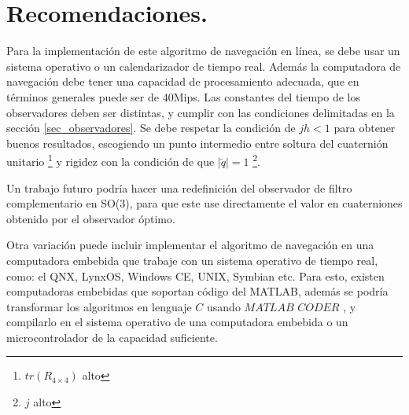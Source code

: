 \documentclass[10pt]{report}
\numberwithin{equation}{chapter}
\numberwithin{algorithm}{chapter}
\begin{document}
\section{Recomendaciones.}
Para la implementación de este algoritmo de navegación en línea, se debe usar un sistema operativo o un calendarizador de tiempo real. Además la computadora de navegación debe tener una capacidad de procesamiento adecuada, que en términos generales puede ser de 40Mips. Las constantes del tiempo de los observadores deben ser distintas, y cumplir con las condiciones delimitadas en la sección \ref{sec_observadores}. Se debe respetar la condición de $jh<1$ para obtener buenos resultados, escogiendo un punto intermedio entre soltura del cuaternión unitario \footnote{$tr(R_{4\times4})$ alto} y rigidez con la condición de que $|\breve{q}|=1$ \footnote{$j$ alto}.\par
Un trabajo futuro podría hacer una redefinición del observador de filtro complementario en SO(3), para que este use directamente el valor en cuaterniones obtenido por el observador óptimo.\par
Otra variación puede incluir implementar el algoritmo de navegación en una computadora embebida que trabaje con un sistema operativo de tiempo real, como: el QNX, LynxOS, Windows CE, UNIX, Symbian etc. Para esto, existen computadoras embebidas que soportan código del MATLAB, además se podría transformar los algoritmos en lenguaje $C$ usando $MATLAB$ $CODER$ , y compilarlo en el sistema operativo de una computadora embebida o un microcontrolador de la capacidad suficiente. \par
\newpage
\pagestyle{BibStyle}
\normalsize
\end{document}

